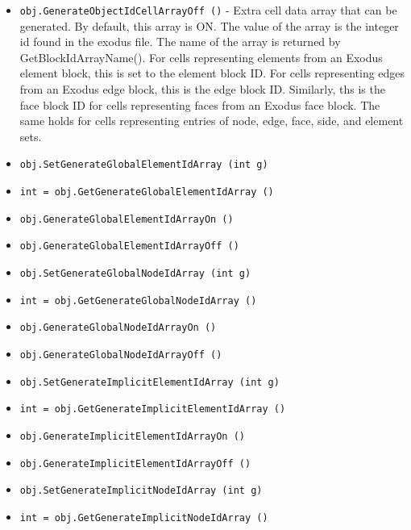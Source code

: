 \begin{itemize}
\item  \verb|obj.GenerateObjectIdCellArrayOff ()| -  Extra cell data array that can be generated.  By default, this array
 is ON.  The value of the array is the integer id found
 in the exodus file. The name of the array is returned by 
 GetBlockIdArrayName(). For cells representing elements from
 an Exodus element block, this is set to the element block ID. For
 cells representing edges from an Exodus edge block, this is the
 edge block ID. Similarly, ths is the face block ID for cells
 representing faces from an Exodus face block. The same holds
 for cells representing entries of node, edge, face, side, and element sets.

\item  \verb|obj.SetGenerateGlobalElementIdArray (int g)|

\item  \verb|int = obj.GetGenerateGlobalElementIdArray ()|

\item  \verb|obj.GenerateGlobalElementIdArrayOn ()|

\item  \verb|obj.GenerateGlobalElementIdArrayOff ()|

\item  \verb|obj.SetGenerateGlobalNodeIdArray (int g)|

\item  \verb|int = obj.GetGenerateGlobalNodeIdArray ()|

\item  \verb|obj.GenerateGlobalNodeIdArrayOn ()|

\item  \verb|obj.GenerateGlobalNodeIdArrayOff ()|

\item  \verb|obj.SetGenerateImplicitElementIdArray (int g)|

\item  \verb|int = obj.GetGenerateImplicitElementIdArray ()|

\item  \verb|obj.GenerateImplicitElementIdArrayOn ()|

\item  \verb|obj.GenerateImplicitElementIdArrayOff ()|

\item  \verb|obj.SetGenerateImplicitNodeIdArray (int g)|

\item  \verb|int = obj.GetGenerateImplicitNodeIdArray ()|


\end{itemize}
